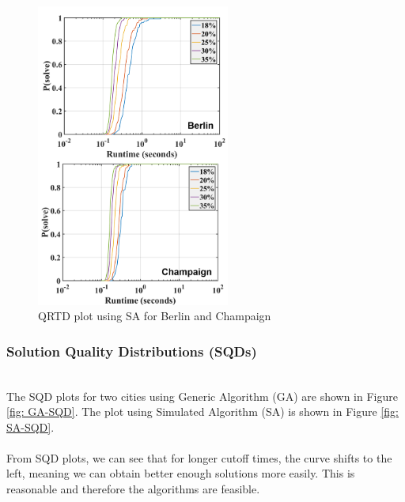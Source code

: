 \begin{figure}
\includegraphics[width=2.5in]{F2-SA-QRTD}
\caption{QRTD plot using SA for Berlin and Champaign}
\label{fig: SA-QRTD}
\end{figure}


\subsubsection{Solution Quality Distributions (SQDs)}
\hfill\\
The SQD plots for two cities using Generic Algorithm (GA) are shown in Figure \ref{fig: GA-SQD}. The plot using Simulated Algorithm (SA) is shown in Figure \ref{fig: SA-SQD}.\\
\hfill\\
From SQD plots, we can see that for longer cutoff times, the curve shifts to the left, meaning we can obtain better enough solutions more easily. This is reasonable and therefore the algorithms are feasible. 


